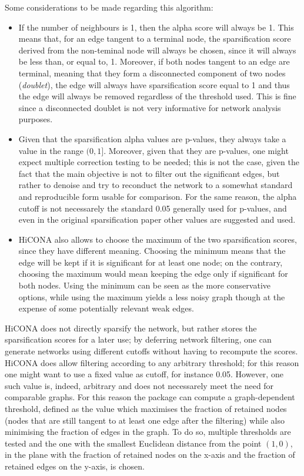 Some considerations to be made regarding this algorithm: 
\begin{itemize}\tightlist
  \item If the number of neighbours is 1, then the alpha score will always be 1. This means that, for an edge tangent to a terminal node, the sparsification score derived from the non-teminal node will always be chosen, since it will always be less than, or equal to, 1. Moreover, if both nodes tangent to an edge are terminal, meaning that they form a disconnected component of two nodes (\emph{doublet}), the edge will always have sparsification score equal to 1 and thus the edge will always be removed regardless of the threshold used. This is fine since a disconnected doublet is not very informative for network analysis purposes.
  \item Given that the sparsification alpha values are p-values, they always take a value in the range $(0,1]$. Moreover, given that they are p-values, one might expect multiple correction testing to be needed; this is not the case, given the fact that the main objective is not to filter out the significant edges, but rather to denoise and try to reconduct the network to a somewhat standard and reproducible form usable for comparison. For the same reason, the alpha cutoff is not necessarely the standard 0.05 generally used for p-values, and even in the original sparsification paper other values are suggested and used.
  \item HiCONA also allows to choose the maximum of the two sparsification scores, since they have different meaning. Choosing the minimum means that the edge will be kept if it is significant for at least one node; on the contrary, choosing the maximum would mean keeping the edge only if significant for both nodes. Using the minimum can be seen as the more conservative options, while using the maximum yields a less noisy graph though at the expense of some potentially relevant weak edges.
\end{itemize}

HiCONA does not directly sparsify the network, but rather stores the sparsification scores for a later use; by deferring network filtering, one can generate networks using different cutoffs without having to recompute the scores. HiCONA does allow filtering according to any arbitrary threshold; for this reason one might want to use a fixed value as cutoff, for instance 0.05. However, one such value is, indeed, arbitrary and does not necessarely meet the need for comparable graphs. For this reason the package can compute a graph-dependent threshold, defined as the value which maximises the fraction of retained nodes (nodes that are still tangent to at least one edge after the filtering) while also minimising the fraction of edges in the graph. To do so, multiple thresholds are tested and the one with the smallest Euclidean distance from the point $(1,0)$, in the plane with the fraction of retained nodes on the x-axis and the fraction of retained edges on the y-axis, is chosen.

